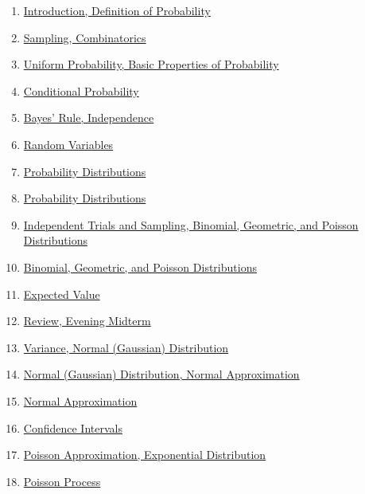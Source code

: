 \documentclass[11pt]{article}
\begin{document}
\begin{enumerate}
	\item \href{https://mp.weixin.qq.com/s/Fun_K27xwnc5e6p3YsMiYQ}{Introduction, Definition of Probability}	%
	\item \href{https://mp.weixin.qq.com/s/yAozVsh0XZu8cEiBXgFtfQ}{Sampling, Combinatorics}	%
	\item \href{https://mp.weixin.qq.com/s/zUy8hlvYJLeaCX2Q8oDSzQ}{Uniform Probability, Basic Properties of Probability}	%
	\item \href{https://mp.weixin.qq.com/s/n1V6dgJvr9pCrglEjxHsqA}{Conditional Probability}	%
	\item \href{https://mp.weixin.qq.com/s/xOZR-evZ_gMSciCJa4fbcQ}{Bayes' Rule, Independence}	%
	\item \href{https://mp.weixin.qq.com/s/l_MkHIiZ32me9VxvCV1ATg}{Random Variables}	%
	\item \href{https://mp.weixin.qq.com/s/jleHfdIrgdlO2uIDgeZPJg}{Probability Distributions}	%
	\item \href{https://mp.weixin.qq.com/s/j4Kytp1dTPXxXUyJV1gi4g}{Probability Distributions}	%
	\item \href{https://mp.weixin.qq.com/s/vxyfyB3zLVuKmNy1VLZp-Q}{Independent Trials and Sampling, Binomial, Geometric, and Poisson Distributions}	%
	\item \href{https://mp.weixin.qq.com/s/_ovwv5eO9WoL09VH6ZN-2w}{Binomial, Geometric, and Poisson Distributions}	%
	\item \href{https://mp.weixin.qq.com/s/oplRmZjHfIAJ8EAAw6voyQ}{Expected Value}	%
	\item \href{https://mp.weixin.qq.com/s/QoHGcvgE_DmdvBORwKpDVQ}{Review, Evening Midterm}	%
	\item \href{https://mp.weixin.qq.com/s/ksdvZhIULwaiMrmKOh0IYg}{Variance, Normal (Gaussian) Distribution}	%
	\item \href{https://mp.weixin.qq.com/s/z3gXbDwmFI-rCEDeZoib2g}{Normal (Gaussian) Distribution, Normal Approximation}	%
	\item \href{https://mp.weixin.qq.com/s/1ANjLLJv1DRUg7f4wOzDPg}{Normal Approximation}	%
	\item \href{https://mp.weixin.qq.com/s/EhmIwe7waTRemY3FilN1KQ}{Confidence Intervals}	%
	\item \href{https://mp.weixin.qq.com/s/nKkbbbMEW5pAoPYxt2KOeg}{Poisson Approximation, Exponential Distribution}	%
	\item \href{https://mp.weixin.qq.com/s/Q_eHDn6C5MMvL6dUB6knOg}{Poisson Process}	%

\end{enumerate}
\end{document}
